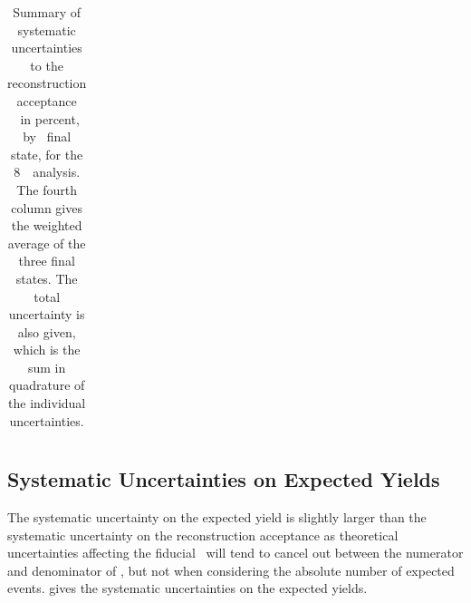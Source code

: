 \begin{table}[htbp]
\begin{tabular}{l c c c c}

   \end{tabular}
   \caption[Systematic uncertainties to the reconstruction acceptance \CZZ\ for
   the 8~\tev\ analysis.]
   {Summary of systematic uncertainties to the reconstruction acceptance \CZZ\
   in percent, by \ZZ\ final state, for the 8~\tev\ analysis. 
   The fourth column gives the weighted average
   of the three final states. The total uncertainty is also given, which is the
   sum in quadrature of the individual uncertainties.} 
   \label{table:objSel-syst-eight}
\end{table}

\subsection{Systematic Uncertainties on Expected Yields}

The systematic uncertainty on the expected yield is slightly larger than the
systematic uncertainty on the reconstruction acceptance as theoretical
uncertainties affecting the fiducial \cx\ will tend to cancel out between the
numerator and denominator of \CZZ, but not when considering the absolute number
of expected events. \tab{objSel-syst-Nexp} gives the systematic uncertainties on
the expected yields.

